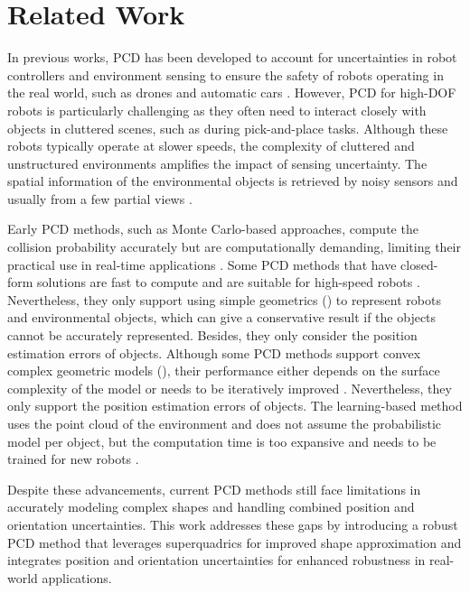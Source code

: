 \section{Related Work}
In previous works, PCD has been developed to account for uncertainties in robot controllers and environment sensing to ensure the safety of robots operating in the real world, such as drones and automatic cars \cite{zhu2019chance, dawson2020provably}. However, PCD for high-DOF robots is particularly challenging as they often need to interact closely with objects in cluttered scenes, such as during pick-and-place tasks. Although these robots typically operate at slower speeds, the complexity of cluttered and unstructured environments amplifies the impact of sensing uncertainty. The spatial information of the environmental objects is retrieved by noisy sensors and usually from a few partial views \cite{burns2007sampling, pan2017probabilistic}. 

Early PCD methods, such as Monte Carlo-based approaches, compute the collision probability accurately but are computationally demanding, limiting their practical use in real-time applications \cite{lambert2008fast}. Some PCD methods that have closed-form solutions are fast to compute and are suitable for high-speed robots \cite{du2011probabilistic, park2018fast, zhu2019chance}. Nevertheless, they only support using simple geometrics () to represent robots and environmental objects, which can give a conservative result if the objects cannot be accurately represented. Besides, they only consider the position estimation errors of objects. Although some PCD methods support convex complex geometric models (), their performance either depends on the surface complexity of the model \cite{park2020efficient} or needs to be iteratively improved \cite{dawson2020provably}. Nevertheless, they only support the position estimation errors of objects. The learning-based method uses the point cloud of the environment and does not assume the probabilistic model per object, but the computation time is too expansive and needs to be trained for new robots \cite{quintero2024stochastic}. 

Despite these advancements, current PCD methods still face limitations in accurately modeling complex shapes and handling combined position and orientation uncertainties. This work addresses these gaps by introducing a robust PCD method that leverages superquadrics for improved shape approximation and integrates position and orientation uncertainties for enhanced robustness in real-world applications.